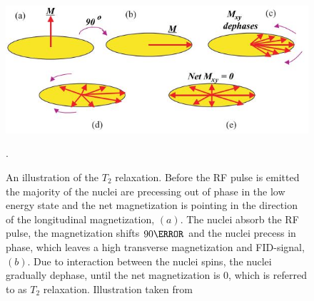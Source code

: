 \begin{figure}[H]                 
	\includegraphics[width=.76\textwidth]{figures/aBackground/T2_relax}  
	\caption{An illustration of the $T_2$ relaxation. Before the RF pulse is emitted the majority of the nuclei are precessing out of phase in the low energy state and the net magnetization is pointing in the direction of the longitudinal magnetization, $(a)$. The nuclei absorb the RF pulse, the magnetization shifts $90 \degree$ and the nuclei precess in phase, which leaves a high transverse magnetization and FID-signal, $(b)$. Due to interaction between the nuclei spins, the nuclei gradually dephase, until the net magnetization is 0, which is referred to as $T_2$ relaxation. Illustration taken from \cite{Bharath2008}}.
	\label{fig:back:T2_relax} 
\end{figure}

